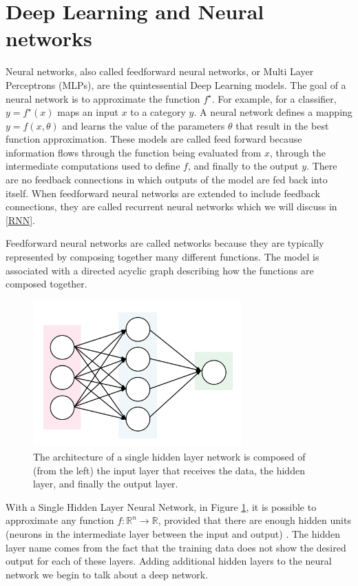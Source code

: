\section{Deep Learning and Neural networks}\label{deep}
Neural networks, also called feedforward neural networks, or Multi Layer Perceptrons (MLPs), are the quintessential Deep Learning models. The goal of a neural network is to approximate the function $f^\star$. For example, for a classifier, $y=f^\star (x)$ maps an input $x$ to a category $y$. A neural network defines a mapping $y=f(x,\theta)$ and learns the value of the parameters $\theta$ that result in the best function approximation. These models are called feed forward because information flows through the function being evaluated from $x$, through the intermediate computations used to define $f$, and finally to the output $y$. There are no feedback connections in which outputs of the model are fed back into itself. When feedforward neural networks are extended to include feedback connections, they are called  recurrent neural networks which we will discuss in \ref{RNN}.

Feedforward neural networks are called networks because they are typically represented by composing together many different functions. The model is associated with a directed acyclic graph describing how the functions are composed together. 

\begin{figure}
	\centering
	\includegraphics[width=8cm]{img/Single_Hidden_Network.png}
	\caption{The architecture of a single hidden layer network is composed of (from the left) the input layer that receives the data, the hidden layer, and finally the output layer.}
	\label{neuralnetwork}
\end{figure}

With a Single Hidden Layer Neural Network, in Figure \ref{neuralnetwork}, it is possible to approximate any function  $f: \mathbb{R}^n \to \mathbb{R}$, provided that there are enough hidden units (neurons in the intermediate layer between the input and output) \cite{cybenko1989approximation}.
The hidden layer name comes from the fact that the training data does not show the desired output for each of these layers. Adding additional hidden layers to the neural network we begin to talk about a deep network.


